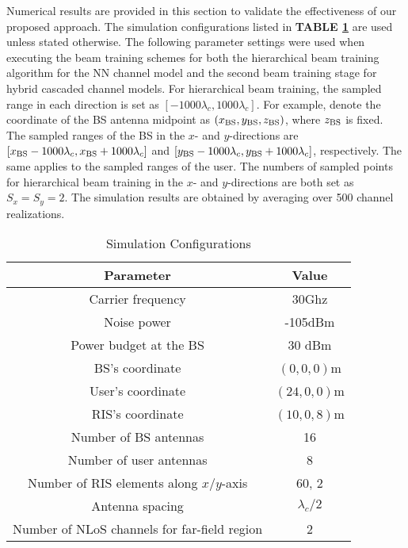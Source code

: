 \documentclass[lettersize, journal]{IEEEtran}
\begin{document}
Numerical results are provided in this section to validate the effectiveness of our proposed approach.
The simulation configurations listed in {\bf{TABLE} {\ref{tab3}}} are used unless stated otherwise. 
The following parameter settings were used when executing the beam training schemes for both the hierarchical beam training algorithm for the NN channel model and the second beam training stage for hybrid cascaded channel models.
For hierarchical beam training, the sampled range in each direction is set as $\left[ -1000\lambda_c, 1000\lambda_c \right]$. 
 For example, denote the coordinate of the BS antenna midpoint as $\left( x_{\rm{BS}}, y_{\rm{BS}}, z_{\rm{BS}} \right)$, where $z_{\rm{BS}}$ is fixed.
The sampled ranges of the BS in the $x$- and $y$-directions are $\left[ x_{\rm{BS}}-1000\lambda_c, x_{\rm{BS}}+1000\lambda_c \right]$ and $\left[ y_{\rm{BS}}-1000\lambda_c, y_{\rm{BS}}+1000\lambda_c \right]$, respectively.
The same applies to the sampled ranges of the user.
The numbers of sampled points for hierarchical beam training in the $x$- and $y$-directions are both set as $S_x = S_y = 2$.
The simulation results are obtained by averaging over 500 channel realizations.

\begin{table}[!t]
  \caption{Simulation Configurations}
  \begin{center}
  \begin{tabular}{|c|c|}%
  \hline
   {\bf{Parameter}} & {\bf{Value}} \\
  \hline
  Carrier frequency & 30Ghz \\
  \hline
  Noise power & -105dBm \\
  \hline
  Power budget at the BS & 30 dBm \\
  \hline
  BS's coordinate & $\left( 0, 0, 0 \right)$m \\
  \hline
  User's coordinate & $\left( 24, 0, 0 \right)$m \\
  \hline
  RIS's coordinate & $\left( 10, 0, 8 \right)$m \\
  \hline
  Number of BS antennas & 16  \\ 
  \hline
  Number of user antennas & 8  \\ 
  \hline
  Number of RIS elements along $x$/$y$-axis & 60, 2  \\ 
  \hline
  Antenna spacing & $\lambda_c/2$ \\
  \hline
  Number of NLoS channels for far-field region & 2 \\
  \hline  
  \end{tabular}
  \label{tab3}
  \end{center}
\end{table}
\end{document}
